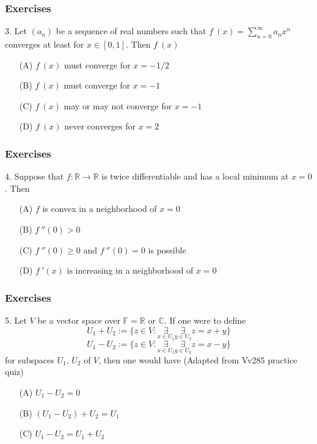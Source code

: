 \documentclass{beamer}
\newcommand{\R}{\mathbb{R}}
\begin{document}
\begin{frame}
    \frametitle{Exercises}
    \hspace{1em}
    3. Let $(a_n)$ be a sequence of real numbers such that
    $f~(x)=\sum_{n=0}^\infty a_n x^n$ converges at least for 
    $x \in [0,1]$. Then $f~(x)$
    \vspace{1em}
    \begin{itemize}
        \item[(A)] $f~(x)$ must converge for $x=-1/2$
        \item[(B)] $f~(x)$ must converge for $x=-1$
        \item[(C)] $f~(x)$ may or may not converge for $x=-1$
        \item[(D)] $f~(x)$ never converges for $x=2$
    \end{itemize}
\end{frame}
\begin{frame}
    \frametitle{Exercises}
    \hspace{1em}
    4. Suppose that $f: \R \to \R$ is twice differentiable and
    has a local minimum at $x=0$. Then
    \vspace{1em}
    \begin{itemize}
        \item[(A)] $f$ is convex in a neighborhood of $x=0$
        \item[(B)] $f~''(0)>0$
        \item[(C)] $f~''(0) \geq 0$ and $f~''(0)=0$ is possible
        \item[(D)] $f~'(x)$  is increasing in a neighborhood of $x=0$
    \end{itemize}
\end{frame}
\begin{frame}
    \frametitle{Exercises}
    \hspace{1em}
    5. Let $V$ be a vector space over $\mathbb{F}=\R \text{ or } \mathbb{C}$.
    If one were to define 
    $$U_1+U_2:= \{ z\in V : \underset{x\in U_1}{\exists} \underset{y \in U_2}{\exists} z=x+y \}$$
    $$U_1-U_2:= \{ z\in V : \underset{x\in U_1}{\exists} \underset{y \in U_2}{\exists} z=x-y \}$$
    for subspaces $U_1$, $U_2$ of $V$, then one would have (Adapted from Vv285 practice quiz)
    \vspace{1em}
    \begin{itemize}
        \item[(A)] $U_1-U_2= {0}$ 
        \item[(B)] $(U_1-U_2)+U_2=U_1$
        \item[(C)] $U_1-U_2=U_1+U_2$  
    \end{itemize}
\end{frame}
\end{document}
